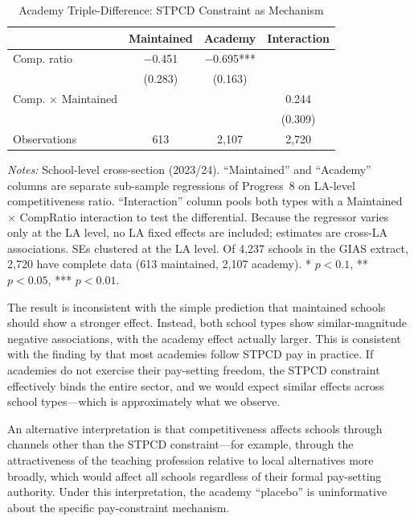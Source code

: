 \documentclass[12pt]{article}
\begin{document}
\begin{table}[H]
\centering
\caption{Academy Triple-Difference: STPCD Constraint as Mechanism}
\label{tab:ddd}
\begin{threeparttable}
\begin{tabular}{lccc}
\toprule
 & Maintained & Academy & Interaction \\
\midrule
Comp. ratio & $-$0.451 & $-$0.695*** & \\
 & (0.283) & (0.163) & \\
Comp. $\times$ Maintained & & & 0.244 \\
 & & & (0.309) \\
\midrule
Observations & 613 & 2,107 & 2,720 \\
\bottomrule
\end{tabular}
\begin{tablenotes}[flushleft]
\small
\item \textit{Notes:} School-level cross-section (2023/24). ``Maintained'' and ``Academy'' columns are separate sub-sample regressions of Progress~8 on LA-level competitiveness ratio. ``Interaction'' column pools both types with a Maintained $\times$ CompRatio interaction to test the differential. Because the regressor varies only at the LA level, no LA fixed effects are included; estimates are cross-LA associations. SEs clustered at the LA level. Of 4,237 schools in the GIAS extract, 2,720 have complete data (613 maintained, 2,107 academy). * $p<0.1$, ** $p<0.05$, *** $p<0.01$.
\end{tablenotes}
\end{threeparttable}
\end{table}

The result is inconsistent with the simple prediction that maintained schools should show a stronger effect. Instead, both school types show similar-magnitude negative associations, with the academy effect actually larger. This is consistent with the finding by \citet{britton2016teacher} that most academies follow STPCD pay in practice. If academies do not exercise their pay-setting freedom, the STPCD constraint effectively binds the entire sector, and we would expect similar effects across school types---which is approximately what we observe.

An alternative interpretation is that competitiveness affects schools through channels other than the STPCD constraint---for example, through the attractiveness of the teaching profession relative to local alternatives more broadly, which would affect all schools regardless of their formal pay-setting authority. Under this interpretation, the academy ``placebo'' is uninformative about the specific pay-constraint mechanism.
\end{document}
